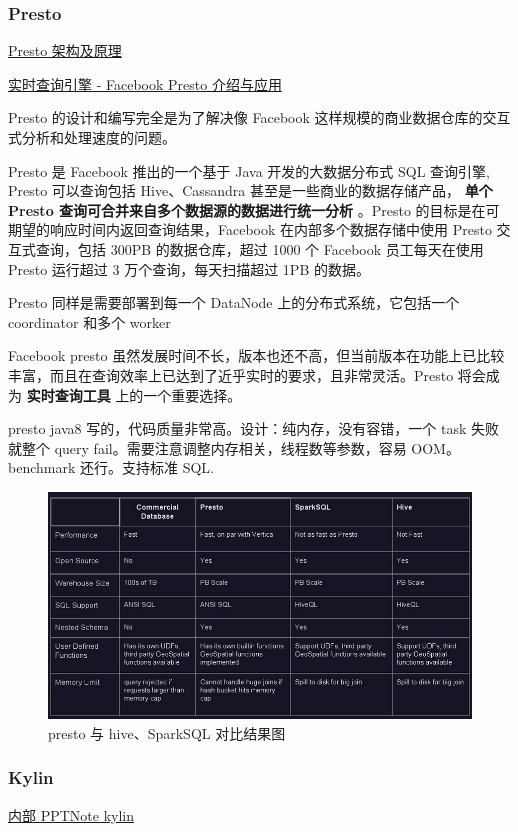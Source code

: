 \documentclass[hyperref, UTF-8]{ctexart}
\begin{document}
\subsubsection{Presto}
\label{sec:org5fae0f3}
\href{http://www.cnblogs.com/tgzhu/p/6033373.html}{Presto 架构及原理}   

\href{http://www.cnblogs.com/hd-zg/p/6904727.html}{实时查询引擎 - Facebook Presto 介绍与应用}   

Presto 的设计和编写完全是为了解决像 Facebook 这样规模的商业数据仓库的交互式分析和处理速度的问题。  

Presto 是 Facebook 推出的一个基于 Java 开发的大数据分布式 SQL 查询引擎, Presto 可以查询包括 Hive、Cassandra 甚至是一些商业的数据存储产品， \textbf{单个 Presto 查询可合并来自多个数据源的数据进行统一分析} 。Presto 的目标是在可期望的响应时间内返回查询结果，Facebook 在内部多个数据存储中使用 Presto 交互式查询，包括 300PB 的数据仓库，超过 1000 个 Facebook 员工每天在使用 Presto 运行超过 3 万个查询，每天扫描超过 1PB 的数据。  

Presto 同样是需要部署到每一个 DataNode 上的分布式系统，它包括一个 coordinator 和多个 worker  

Facebook presto 虽然发展时间不长，版本也还不高，但当前版本在功能上已比较丰富，而且在查询效率上已达到了近乎实时的要求，且非常灵活。Presto 将会成为 \textbf{实时查询工具} 上的一个重要选择。

presto java8 写的，代码质量非常高。设计：纯内存，没有容错，一个 task 失败就整个 query fail。需要注意调整内存相关，线程数等参数，容易 OOM。benchmark 还行。支持标准 SQL.

\begin{figure}[htbp]
\centering
\includegraphics[width=.9\linewidth]{Component/1004194-20161107110246155-560444169_2017-11-30_08-45-32.png}
\caption{presto 与 hive、SparkSQL 对比结果图}
\end{figure}
\subsubsection{Kylin}
\label{sec:org40cd42f}
\hyperref[org6fb8a8c]{内部 PPTNote kylin} 
\end{document}

